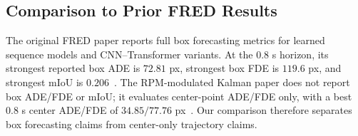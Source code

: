 \begin{table}[t]
  \centering
  \caption{Forecasting results on the decorrelated sample split.}
  \label{tab:decorrelated-results}
\end{table}

\subsection{Comparison to Prior FRED Results}

The original FRED paper reports full box forecasting metrics for learned sequence models and CNN--Transformer variants. At the $0.8$ s horizon, its strongest reported box ADE is $72.81$ px, strongest box FDE is $119.6$ px, and strongest mIoU is $0.206$~\cite{magrini_fred_2025}. The RPM-modulated Kalman paper does not report box ADE/FDE or mIoU; it evaluates center-point ADE/FDE only, with a best $0.8$ s center ADE/FDE of $34.85/77.76$ px~\cite{rpm_kalman_2026}. Our comparison therefore separates box forecasting claims from center-only trajectory claims.

